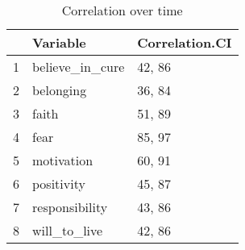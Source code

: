 \begin{table}[ht]
\centering
\begin{tabular}{|r|l|l|}
  \hline
 & Variable & Correlation.CI \\ 
  \hline
1 & believe\_in\_cure & 42, 86 \\ 
  2 & belonging & 36, 84 \\ 
  3 & faith & 51, 89 \\ 
  4 & fear & 85, 97 \\ 
  5 & motivation & 60, 91 \\ 
  6 & positivity & 45, 87 \\ 
  7 & responsibility & 43, 86 \\ 
  8 & will\_to\_live & 42, 86 \\ 
   \hline
\end{tabular}
\caption{Correlation over time} 
\label{correlation_over_time}
\end{table}
